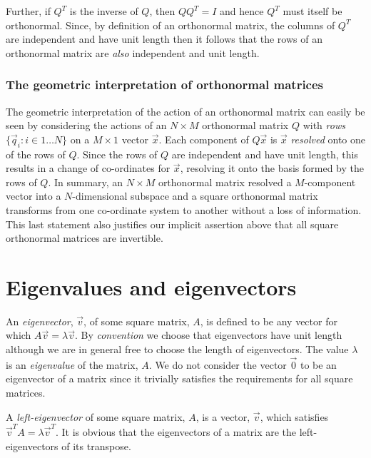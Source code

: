 \documentclass[a4paper]{article}
\newcommand{\highlight}[1]{{\color{blue}#1}}
\begin{document}
Further, if $Q^T$ is the inverse of $Q$, then $QQ^T = I$ and hence $Q^T$ must
itself be orthonormal. Since, by definition of an orthonormal matrix, the columns
of $Q^T$ are independent and have unit length then it follows that
\highlight{the rows of an orthonormal matrix are \emph{also} independent and
unit length}.

\subsubsection{The geometric interpretation of orthonormal matrices}

The geometric interpretation of the action of an orthonormal matrix can easily
be seen by considering the actions of an $N \times M$ orthonormal matrix $Q$
with \emph{rows} $\{ \vec{q}_i : i \in 1 \dots N \}$ on a $M \times 1$ vector
$\vec{x}$. Each component of $Q\vec{x}$ is $\vec{x}$ \emph{resolved} onto one of
the rows of $Q$. Since the rows of $Q$ are independent and have unit length,
this results in a change of co-ordinates for $\vec{x}$, resolving it onto the
basis formed by the rows of $Q$.  In summary, \highlight{an $N \times M$
orthonormal matrix resolved a $M$-component vector into a $N$-dimensional
subspace} and \highlight{a square orthonormal matrix transforms from one
co-ordinate system to another without a loss of information}. This last
statement also justifies our implicit assertion above that all square
orthonormal matrices are invertible.

\section{Eigenvalues and eigenvectors}

An \emph{eigenvector}, $\vec{v}$, of some \highlight{square matrix}, $A$, is
defined to be any vector for which \highlight{$A \vec{v} = \lambda \vec{v}$}. By
\emph{convention} we choose that \highlight{eigenvectors have unit length}
although we are in general free to choose the length of eigenvectors. The value
$\lambda$ is an \emph{eigenvalue} of the matrix, $A$.  \highlight{We do not
consider the vector $\vec{0}$ to be an eigenvector} of a matrix since it
trivially satisfies the requirements for all square matrices.

A \emph{left-eigenvector} of some square matrix, $A$, is a vector, $\vec{v}$,
which satisfies \highlight{$\vec{v}^T A = \lambda \vec{v}^T$}. It is obvious
that \highlight{the eigenvectors of a matrix are the left-eigenvectors of its
transpose}.
\end{document}
